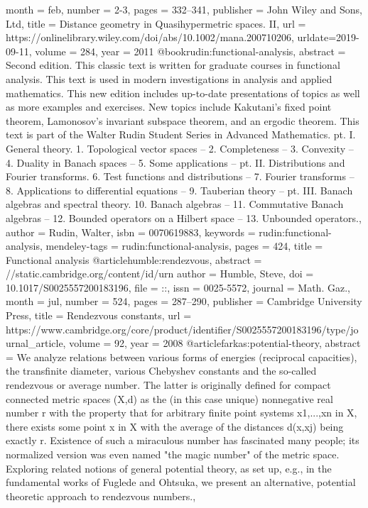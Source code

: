 {{{{month = {feb},
number = {2-3},
pages = {332--341},
publisher = {John Wiley and Sons, Ltd},
title = {{Distance geometry in Quasihypermetric spaces. II}},
url = {https://onlinelibrary.wiley.com/doi/abs/10.1002/mana.200710206},
urldate={2019-09-11},
volume = {284},
year = {2011}
}
@book{rudin:functional-analysis,
abstract = {Second edition. This classic text is written for graduate courses in functional analysis. This text is used in modern investigations in analysis and applied mathematics. This new edition includes up-to-date presentations of topics as well as more examples and exercises. New topics include Kakutani's fixed point theorem, Lamonosov's invariant subspace theorem, and an ergodic theorem. This text is part of the Walter Rudin Student Series in Advanced Mathematics. pt. I. General theory. 1. Topological vector spaces -- 2. Completeness -- 3. Convexity -- 4. Duality in Banach spaces -- 5. Some applications -- pt. II. Distributions and Fourier transforms. 6. Test functions and distributions -- 7. Fourier transforms -- 8. Applications to differential equations -- 9. Tauberian theory -- pt. III. Banach algebras and spectral theory. 10. Banach algebras -- 11. Commutative Banach algebras -- 12. Bounded operators on a Hilbert space -- 13. Unbounded operators.},
author = {Rudin, Walter},
isbn = {0070619883},
keywords = {rudin:functional-analysis},
mendeley-tags = {rudin:functional-analysis},
pages = {424},
title = {{Functional analysis}}
}
@article{humble:rendezvous,
abstract = {//static.cambridge.org/content/id/urn%
author = {Humble, Steve},
doi = {10.1017/S0025557200183196},
file = {::},
issn = {0025-5572},
journal = {Math. Gaz.},
month = {jul},
number = {524},
pages = {287--290},
publisher = {Cambridge University Press},
title = {{Rendezvous constants}},
url = {https://www.cambridge.org/core/product/identifier/S0025557200183196/type/journal_article},
volume = {92},
year = {2008}
}
@article{farkas:potential-theory,
abstract = {We analyze relations between various forms of energies (reciprocal capacities), the transfinite diameter, various Chebyshev constants and the so-called rendezvous or average number. The latter is originally defined for compact connected metric spaces (X,d) as the (in this case unique) nonnegative real number r with the property that for arbitrary finite point systems {x1,...,xn} in X, there exists some point x in X with the average of the distances d(x,xj) being exactly r. Existence of such a miraculous number has fascinated many people; its normalized version was even named "the magic number" of the metric space. Exploring related notions of general potential theory, as set up, e.g., in the fundamental works of Fuglede and Ohtsuka, we present an alternative, potential theoretic approach to rendezvous numbers.},
}}}}}
